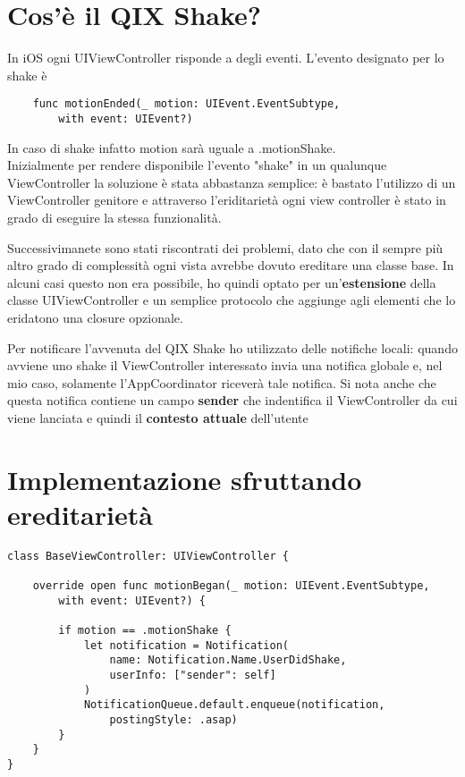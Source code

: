 
\section{Cos'è il QIX Shake?}

In iOS ogni UIViewController risponde a degli eventi. L'evento designato per lo shake è
\begin{verbatim}
    func motionEnded(_ motion: UIEvent.EventSubtype,
        with event: UIEvent?)
\end{verbatim}

In caso di shake infatto motion sarà uguale a .motionShake. \\

Inizialmente per rendere disponibile l'evento "shake" in un qualunque ViewController la soluzione è stata abbastanza semplice:
è bastato l'utilizzo di un ViewController genitore e attraverso l'eriditarietà ogni view controller è stato in grado
di eseguire la stessa funzionalità.

Successivimanete sono stati riscontrati dei problemi, dato che con il sempre più altro grado di complessità
ogni vista avrebbe dovuto ereditare una classe base. In alcuni casi questo non era possibile, ho quindi optato 
per un'\textbf{estensione} della classe UIViewController e un semplice protocolo che aggiunge agli elementi che lo eridatono
una closure opzionale.

Per notificare l'avvenuta del QIX Shake ho utilizzato delle notifiche locali: quando avviene uno shake il ViewController interessato invia 
una notifica globale e, nel mio caso, solamente l'AppCoordinator riceverà tale notifica.
Si nota anche che questa notifica contiene un campo \textbf{sender} che indentifica il ViewController da cui viene lanciata e quindi
il \textbf{contesto attuale} dell'utente

\section{Implementazione sfruttando ereditarietà}

\begin{verbatim}
class BaseViewController: UIViewController {

    override open func motionBegan(_ motion: UIEvent.EventSubtype,
        with event: UIEvent?) {
            
        if motion == .motionShake {
            let notification = Notification(
                name: Notification.Name.UserDidShake,
                userInfo: ["sender": self]
            )
            NotificationQueue.default.enqueue(notification,
                postingStyle: .asap)
        }
    }
}
\end{verbatim}


